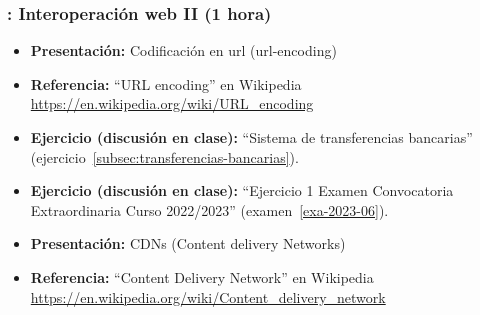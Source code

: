 \documentclass[a4paper,12pt]{article}
\begin{document}
\subsubsection{\martesG: Interoperación web II (1 hora)}
\label{cal:martesG}

\begin{itemize}


\item \textbf{Presentación:} Codificación en url (url-encoding)
\item \textbf{Referencia:} ``URL encoding'' en Wikipedia \\ \url{https://en.wikipedia.org/wiki/URL_encoding}

\item \textbf{Ejercicio (discusión en clase):} ``Sistema de transferencias bancarias'' (ejercicio~\ref{subsec:transferencias-bancarias}).

\item \textbf{Ejercicio (discusión en clase):} ``Ejercicio 1 Examen Convocatoria Extraordinaria Curso 2022/2023'' (examen~\ref{exa-2023-06}).

\item \textbf{Presentación:} CDNs (Content delivery Networks)
\item \textbf{Referencia:} ``Content Delivery Network'' en Wikipedia \\ \url{https://en.wikipedia.org/wiki/Content_delivery_network}


\end{itemize}



\end{document}
